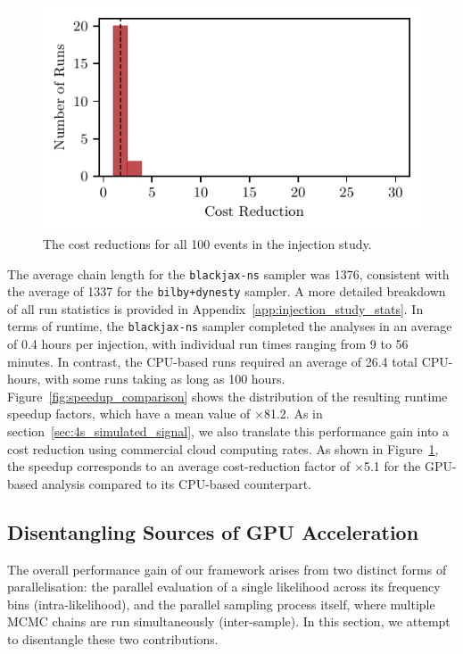 \documentclass[fleqn,usenatbib]{mnras}
\begin{document}
\begin{figure}
    \centering
    \includegraphics{figures/cost_reduction.pdf}
    \caption{The cost reductions for all 100 events in the injection study.}
    \label{fig:cost_reduction}
\end{figure}

The average chain length for the \texttt{blackjax-ns}
sampler was 1376, consistent with the average of 1337 for the
\texttt{bilby+dynesty} sampler. A more detailed breakdown of all run
statistics is provided in Appendix~\ref{app:injection_study_stats}.
In terms of runtime, the \texttt{blackjax-ns} sampler completed the analyses
in an average of 0.4 hours per injection, with individual run
times ranging from 9 to 56 minutes.
In contrast, the CPU-based runs
required an average of 26.4 total CPU-hours, with some runs taking as long as 
100 hours. 
Figure~\ref{fig:speedup_comparison} shows the distribution of the
resulting runtime speedup factors, which have a mean value of
$\times$81.2. As in 
section~\ref{sec:4s_simulated_signal}, we also translate this performance 
gain into a cost reduction using commercial cloud computing rates.
As shown in Figure~\ref{fig:cost_reduction}, the speedup
corresponds to an average cost-reduction factor of $\times$5.1 for the
GPU-based analysis compared to its CPU-based counterpart.

\subsection{Disentangling Sources of GPU Acceleration}
\label{sec:disentangling_acceleration}

The overall performance gain of our framework arises from two distinct
forms of parallelisation: the parallel evaluation of a single
likelihood across its frequency bins (intra-likelihood), and the
parallel sampling process itself, where multiple MCMC chains are run
simultaneously (inter-sample). In this section, we attempt to disentangle
these two contributions.
\end{document}
